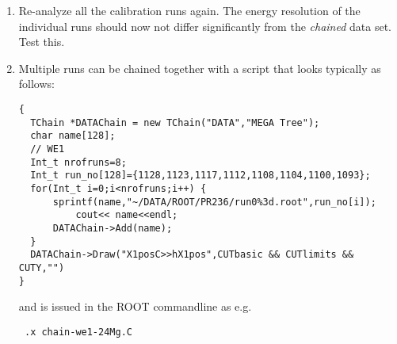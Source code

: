\documentclass[11pt]{report}
\begin{document}
\begin{enumerate}
In the begin-of-run (BOR) routine in routine {\it main\_bor} in {\it main.c} you will 
find a {\it switch} statement similar to the following:
\begin{verbatim} 
switch(runinfo2.run_number){
case 1064: x1offset=0; printf("run %d: x1 offset= %f \n",runinfo2.run_number,x1offset); break;   
case 1093: x1offset=1.31073; printf("run %d: x1 offset= %f \n",runinfo2.run_number,x1offset); break;   
case 1100: x1offset=0.754578; printf("run %d: x1 offset= %f \n",runinfo2.run_number,x1offset); break;   
case 1104: x1offset=-0.309448; printf("run %d: x1 offset= %f \n",runinfo2.run_number,x1offset); break;   
case 1108: x1offset=-0.585632; printf("run %d: x1 offset= %f \n",runinfo2.run_number,x1offset); break;   
case 1128: x1offset=-0.0202026; printf("run %d: x1 offset= %f \n",runinfo2.run_number,x1offset); break;  
}
\end{verbatim}
Here you can insert the position difference (in mm) between the prominent peak in the first calibration
run relative to the other calibration runs, referred to as $x1offset$ in the code.
In fact, the script  {\it get-peakpos-Mg-we1.C} should print out these lines that you
can then just paste into {\it main.c}.
%
In this example above run 1064 was the first calibration run, hence the offset value of 0 mm.
Since the change that is made here is to the {\it C++} code, you have to recompile the analyzer executable
(using the {\it make} utility) before moving on to the next step.


\item Re-analyze all the calibration runs again. 
The energy resolution of the individual runs
should now not differ significantly from the {\it chained} data set. 
Test this.

\item
Multiple runs can be chained together with a script that looks typically as follows:
\begin{verbatim} 
{
  TChain *DATAChain = new TChain("DATA","MEGA Tree");
  char name[128];
  // WE1
  Int_t nrofruns=8; 
  Int_t run_no[128]={1128,1123,1117,1112,1108,1104,1100,1093};
  for(Int_t i=0;i<nrofruns;i++)	{
	  sprintf(name,"~/DATA/ROOT/PR236/run0%3d.root",run_no[i]);
          cout<< name<<endl;
	  DATAChain->Add(name);
  }
  DATAChain->Draw("X1posC>>hX1pos",CUTbasic && CUTlimits && CUTY,"")
} 
\end{verbatim}
and is issued in the ROOT commandline as e.g.
\begin{verbatim} .x chain-we1-24Mg.C \end{verbatim}


\end{enumerate}
\end{document}
